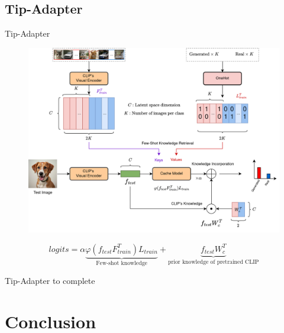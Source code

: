 \documentclass[11pt,compress]{beamer} %
\begin{document}

\subsection{Tip-Adapter}
\begin{frame}{Tip-Adapter}
  \begin{figure}
    \includegraphics[height=.7\textheight]{img/tip_adapter_binary.png}
  \end{figure}
  \begin{equation}
    logits = \alpha\underbrace{\varphi(f_{test}F_{train}^T)L_{train}}_{\text{Few-shot knowledge}} + \underbrace{f_{test}W_c^T}_{\text{prior knowledge of pretrained CLIP}} \nonumber
  \end{equation}
\end{frame}

\begin{frame}{Tip-Adapter}
  to complete
\end{frame}

\section{Conclusion}
\end{document}
